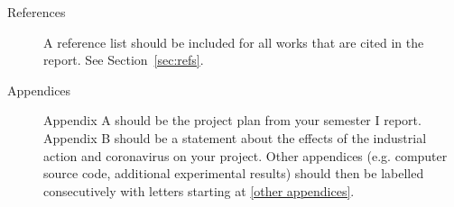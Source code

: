 \documentclass[aps,pra,twocolumn]{revtex4-2}
\begin{document}
\begin{description}
\item[References]	A reference list should be included for all works that are cited in the report. See Section~\ref{sec:refs}.

\item[Appendices]	Appendix A should be the project plan from your semester I report. Appendix B should be a statement about the effects of the industrial action and coronavirus on your project. Other appendices (e.g. computer source code, additional experimental results) should then be labelled consecutively with letters starting at \ref{other appendices}. 
\end{description}

%

\end{document}
